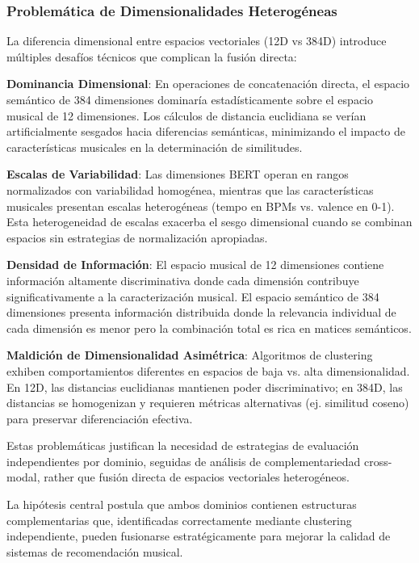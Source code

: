 \documentclass[12pt,a4paper]{report}
\begin{document}
\subsubsection{Problemática de Dimensionalidades Heterogéneas}

La diferencia dimensional entre espacios vectoriales (12D vs 384D) introduce múltiples desafíos técnicos que complican la fusión directa:

\textbf{Dominancia Dimensional}: En operaciones de concatenación directa, el espacio semántico de 384 dimensiones dominaría estadísticamente sobre el espacio musical de 12 dimensiones. Los cálculos de distancia euclidiana se verían artificialmente sesgados hacia diferencias semánticas, minimizando el impacto de características musicales en la determinación de similitudes.

\textbf{Escalas de Variabilidad}: Las dimensiones BERT operan en rangos normalizados con variabilidad homogénea, mientras que las características musicales presentan escalas heterogéneas (tempo en BPMs vs. valence en 0-1). Esta heterogeneidad de escalas exacerba el sesgo dimensional cuando se combinan espacios sin estrategias de normalización apropiadas.

\textbf{Densidad de Información}: El espacio musical de 12 dimensiones contiene información altamente discriminativa donde cada dimensión contribuye significativamente a la caracterización musical. El espacio semántico de 384 dimensiones presenta información distribuida donde la relevancia individual de cada dimensión es menor pero la combinación total es rica en matices semánticos.

\textbf{Maldición de Dimensionalidad Asimétrica}: Algoritmos de clustering exhiben comportamientos diferentes en espacios de baja vs. alta dimensionalidad. En 12D, las distancias euclidianas mantienen poder discriminativo; en 384D, las distancias se homogenizan y requieren métricas alternativas (ej. similitud coseno) para preservar diferenciación efectiva.

Estas problemáticas justifican la necesidad de estrategias de evaluación independientes por dominio, seguidas de análisis de complementariedad cross-modal, rather que fusión directa de espacios vectoriales heterogéneos.

La hipótesis central postula que ambos dominios contienen estructuras complementarias que, identificadas correctamente mediante clustering independiente, pueden fusionarse estratégicamente para mejorar la calidad de sistemas de recomendación musical.
\end{document}
